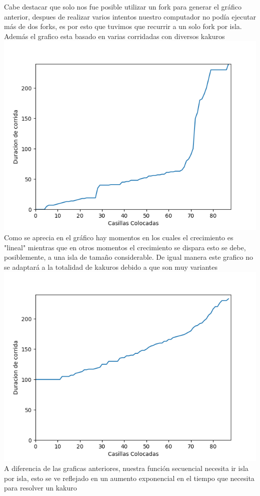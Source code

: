\documentclass[conference]{IEEEtran}
\begin{document}
Cabe destacar que solo nos fue posible utilizar un fork para generar el gráfico anterior, despues de realizar varios intentos nuestro computador no podía ejecutar más de dos forks, es por esto que tuvimos que recurrir a un solo fork por isla. Además el grafico esta basado en varias corridadas con diversos kakuros\newline
\centering	\includegraphics[width=\linewidth]{Grafico Hilos.png}\newline
Como se aprecia en el gráfico hay momentos en los cuales el crecimiento es "lineal" mientras que en otros momentos el crecimiento se dispara esto se debe, posiblemente, a una isla de tamaño considerable. De igual manera este grafico no se adaptará a la totalidad de kakuros debido a que son muy variantes \newline\newline\newline\newline\newline
\centering	\includegraphics[width=\linewidth]{Grafico Secuencial.png}
A diferencia de las graficas anteriores, nuestra función secuencial necesita ir isla por isla, esto se ve reflejado en un aumento exponencial en el tiempo que necesita para resolver un kakuro 
\end{document}

